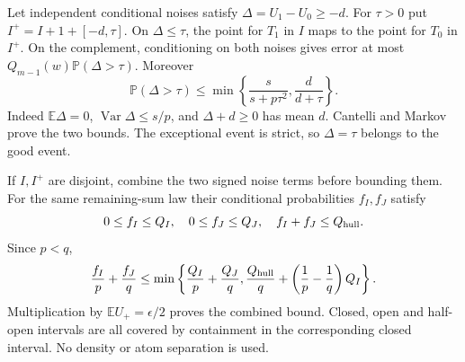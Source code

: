 \documentclass[11pt,a4paper]{article}
\numberwithin{equation}{section}
\theoremstyle{definition}
\theoremstyle{remark}
\newcommand{\E}{\mathbb E}
\newcommand{\Pp}{\mathbb P}
\begin{document}
Let independent conditional noises satisfy $\Delta=U_1-U_0\ge-d$.
For $\tau>0$ put $I^+=I+1+[-d,\tau]$. On $\Delta\le\tau$, the
point for $T_1$ in $I$ maps to the point for $T_0$ in $I^+$. On the
complement, conditioning on both noises gives error at most
$Q_{m-1}(w)\Pp(\Delta>\tau)$. Moreover
\begin{equation}\label{cut49:conf:bad}
 \Pp(\Delta>\tau)\le
 \min\left\{\frac{s}{s+p\tau^2},\frac d{d+\tau}\right\}.
\end{equation}
Indeed $\E\Delta=0$, $\operatorname{Var}\Delta\le s/p$, and
$\Delta+d\ge0$ has mean $d$. Cantelli and Markov prove the two bounds.
The exceptional event is strict, so $\Delta=\tau$ belongs to the good event.

If $I,I^+$ are disjoint, combine the two signed noise terms before
bounding them. For the same remaining-sum law their conditional
probabilities $f_I,f_J$ satisfy
\[
 0\le f_I\le Q_I,\quad0\le f_J\le Q_J,\quad f_I+f_J\le Q_{\rm hull}.
\]
Since $p<q$,
\[
 \frac{f_I}{p}+\frac{f_J}{q}
 \le\min\left\{\frac{Q_I}p+\frac{Q_J}q,
 \frac{Q_{\rm hull}}q+\left(\frac1p-\frac1q\right)Q_I\right\}.
\]
Multiplication by $\E U_+=\epsilon/2$ proves the combined bound.
Closed, open and half-open intervals are all covered by containment in
the corresponding closed interval. No density or atom separation is used.
\end{document}

